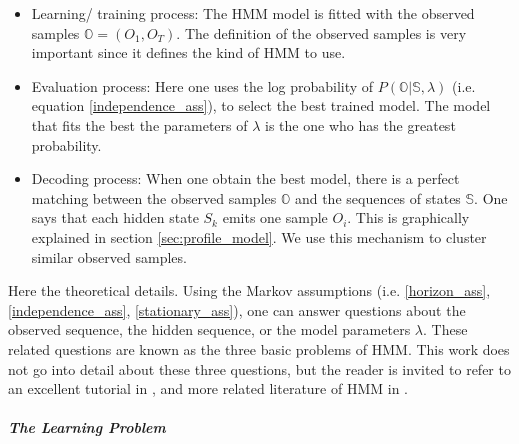 \begin{itemize}
\item Learning/ training process: The HMM model is fitted with the observed samples $\mathbb{O} = (O_1, O_T)$. The definition of the observed samples is very important since it defines the kind of HMM to use.
\item Evaluation process: Here one uses the log probability of $P(\mathbb{O} |\mathbb{S}, \lambda)$ (i.e. equation \ref{independence_ass}), to select the best trained model. The model that fits the best the parameters of $\lambda$ is the one who has the greatest probability.
\item Decoding process: When one obtain the best model, there is a perfect matching between the observed samples $\mathbb{O}$ and the sequences of states $\mathbb{S}$. One says that each hidden state $S_k$ emits one sample $O_i$. This is graphically explained in section \ref{sec:profile_model}. We use this mechanism to cluster similar observed samples.  
\end{itemize}

Here the theoretical details. Using the Markov assumptions (i.e. \ref{horizon_ass}, \ref{independence_ass}, \ref{stationary_ass}), one can answer questions about the observed sequence, the hidden sequence, or the model parameters $\lambda$. These related questions are known as the three basic problems of HMM. This work does not go into detail about these three questions, but the reader is invited to refer to an excellent tutorial in \cite{bilmes1998gentle}, and more related literature of HMM in \cite{haussler1996generalized, ghahramani2001introduction, stamp2004revealing, ramage2007hidden, pfundstein2011hidden}. 


\subparagraph{The Learning Problem}
\label{sec:learning_HMM}

